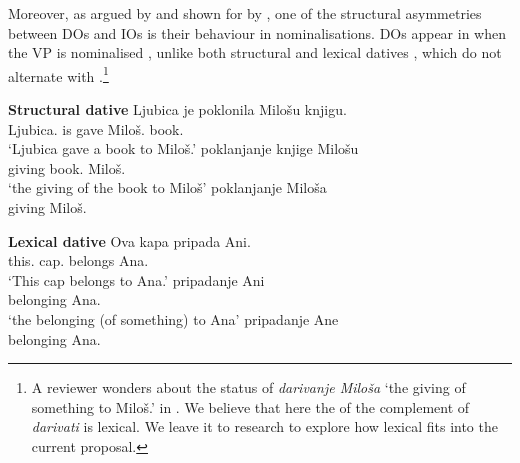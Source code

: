 \documentclass[output=paper,modfonts,newtxmath,hidelinks]{langscibook}
\begin{document}
\ea
{}\label{16:ex21a}
\label{16:ex21b}
\z \z
 
\noindent Moreover, as argued by \citet{maling01} and shown for  by \citet{mcfadden04}, one of the structural asymmetries between DOs and IOs is their behaviour in nominalisations. DOs appear in  when the VP is nominalised , unlike both structural  and lexical datives , which do not alternate with .\footnote{A reviewer wonders about the status of \textit{darivanje Miloša} `the giving of something to Miloš.\genn' in . We believe that here the  of the complement of   \textit{darivati} is lexical. We leave it to  research to explore how lexical  fits into the current proposal.}

\ea \textbf{Structural dative}
\ea \gll Ljubica je poklonila Milošu knjigu.\\
Ljubica.\nomm{} is gave Miloš.\datt{} book.\accc\\
\glt `Ljubica gave a book to Miloš.'
\ex \gll poklanjanje knjige Milošu\\
giving book.\genn{} Miloš.\datt\\
\glt `the giving of the book to Miloš'\label{16:ex22b}
\ex\label{16:ex22c} \gll poklanjanje Miloša\\
giving Miloš.\genn\\
\z \z \z

\ea \textbf{Lexical dative}\label{16:ex23}
\ea\gll Ova kapa pripada Ani.\\
this.\nomm{} cap.\nomm{} belongs Ana.\datt\\
\glt `This cap belongs to Ana.'
\ex\gll pripadanje Ani\\
belonging Ana.\datt\\
\glt `the belonging (of something) to Ana'
\ex\gll pripadanje Ane\\
belonging Ana.\genn\\
\z \z \z
\newpage 
\end{document}
